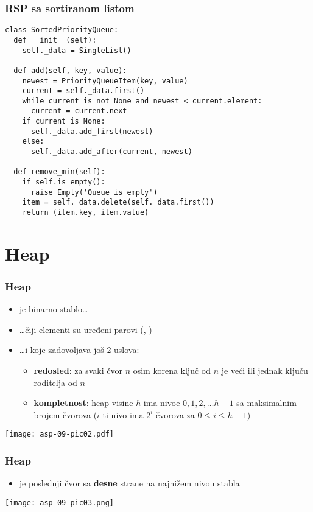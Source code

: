 \documentclass[compress]{beamer}
\begin{document}
\begin{frame}
  \frametitle{RSP sa sortiranom listom}
\begin{verbatim}
class SortedPriorityQueue:
  def __init__(self):
    self._data = SingleList()
    
  def add(self, key, value):
    newest = PriorityQueueItem(key, value)
    current = self._data.first()
    while current is not None and newest < current.element:
      current = current.next 
    if current is None:
      self._data.add_first(newest)
    else:
      self._data.add_after(current, newest)
    
  def remove_min(self):
    if self.is_empty():
      raise Empty('Queue is empty')
    item = self._data.delete(self._data.first())
    return (item.key, item.value)
\end{verbatim}
\end{frame}

\section[Heap]{Heap}
\begin{frame}[fragile]
  \frametitle{Heap}
  \begin{itemize}
    \item {} je binarno stablo\ldots 
    \item \ldots čiji elementi su uređeni parovi (, )
    \item \ldots i koje zadovoljava još 2 uslova:
    \begin{itemize}
      \item \textbf{redosled}: za svaki čvor $n$ osim korena ključ od $n$ je veći ili jednak ključu roditelja od $n$
      \item \textbf{kompletnost}: heap visine $h$ ima nivoe $0, 1, 2,\ldots h-1$ sa maksimalnim brojem čvorova ($i$-ti nivo ima $2^i$ čvorova za $0\leq i\leq
      h-1$)
    \end{itemize}
  \end{itemize}
  \begin{center}
    \texttt{[image: asp-09-pic02.pdf]}
  \end{center}
\end{frame}

\begin{frame}[fragile]
  \frametitle{Heap}
  \begin{itemize}
    \item {} je poslednji čvor sa \textbf{desne} strane na
    najnižem nivou stabla
  \end{itemize}
  \begin{center}
    \texttt{[image: asp-09-pic03.png]}
  \end{center}
\end{frame}
\end{document}
